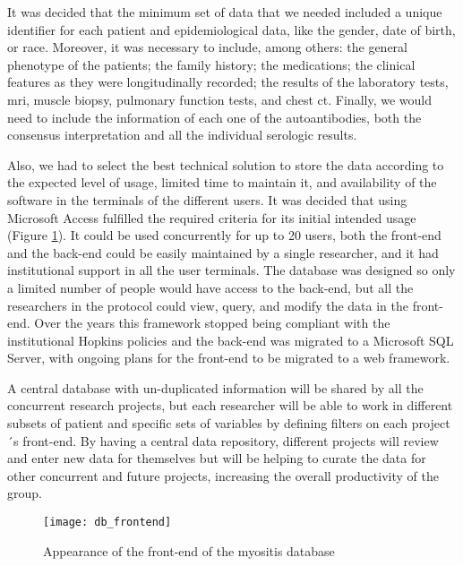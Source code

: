It was decided that the minimum set of data that we needed included a unique identifier for each patient and epidemiological data, like the gender, date of birth, or race. Moreover, it was necessary to include, among others: the general phenotype of the patients; the family history; the medications; the clinical features as they were longitudinally recorded; the results of the laboratory tests, \gls{mri}, muscle biopsy, pulmonary function tests, and chest \gls{ct}. Finally, we would need to include the information of each one of the autoantibodies, both the consensus interpretation and all the individual serologic results.

Also, we had to select the best technical solution to store the data according to the expected level of usage, limited time to maintain it, and availability of the software in the terminals of the different users. It was decided that using Microsoft Access fulfilled the required criteria for its initial intended usage (Figure \ref{fig:db_frontend}). It could be used concurrently for up to 20 users, both the front-end and the back-end could be easily maintained by a single researcher, and it had institutional support in all the user terminals. The database was designed so only a limited number of people would have access to the back-end, but all the researchers in the protocol could view, query, and modify the data in the front-end. Over the years this framework stopped being compliant with the institutional Hopkins policies and the back-end was migrated to a Microsoft SQL Server, with ongoing plans for the front-end to be migrated to a web framework.

A central database with un-duplicated information will be shared by all the concurrent research projects, but each researcher will be able to work in different subsets of patient and specific sets of variables by defining filters on each project´s front-end. By having a central data repository, different projects will review and enter new data for themselves but will be helping to curate the data for other concurrent and future projects, increasing the overall productivity of the group.

\begin{figure}
	\centering
	\texttt{[image: db\_frontend]}
	\caption{Appearance of the front-end of the myositis database}
	\label{fig:db_frontend}
\end{figure}

